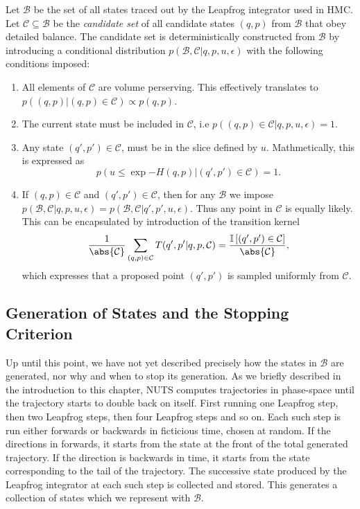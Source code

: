 Let $\mathcal{B}$ be the set of all states traced out by the Leapfrog integrator used in HMC. Let $\mathcal{C} \subseteq \mathcal{B}$ be 
the \textit{candidate set} of all candidate states $(q, p)$ from $\mathcal{B}$ that obey detailed balance. The candidate set is deterministically constructed from $\mathcal{B}$ by introducing a conditional distribution $p(\mathcal{B}, \mathcal{C}|q, p, u, \epsilon)$ with the following conditions imposed:
\begin{enumerate}
    \item All elements of $\mathcal{C}$ are volume perserving. This effectively translates to $p((q, p)|(q, p) \in \mathcal{C}) \propto p(q, p)$.
    \item The current state must be included in $\mathcal{C}$, i.e $p\left((q, p) \in \mathcal{C}|q, p, u, \epsilon\right) = 1$.
    \item Any state $(q', p') \in \mathcal{C}$, must be in the slice defined by $u$. 
    Mathmetically, this is expressed as $$p\left(u\leq \exp{-H(q, p)}\bigg|(q', p') \in \mathcal{C}\right) = 1.$$
    \item If $(q, p) \in \mathcal{C}$ and $(q', p') \in \mathcal{C}$, then for any $\mathcal{B}$ we impose 
    $p(\mathcal{B}, \mathcal{C}|q, p, u, \epsilon) = p(\mathcal{B}, \mathcal{C}|q', p', u, \epsilon)$.
    Thus any point in $\mathcal{C}$ is equally likely. This can be encapsulated by introduction of the transition kernel
    \begin{equation}
        \frac{1}{\abs{\mathcal{C}}}\sum_{(q, p) \in \mathcal{C}} T(q', p'|q,p,\mathcal{C}) = \frac{\mathbb{I}\left[(q',p') \in \mathcal{C}\right]}{\abs{\mathcal{C}}},
    \end{equation}
    which expresses that a proposed point $(q', p')$ is sampled uniformly from $\mathcal{C}$. 
\end{enumerate}


\subsection{Generation of States and the Stopping Criterion}
Up until this point, we have not yet described precisely how the states in $\mathcal{B}$ are generated,
nor why and when to stop its generation. As we briefly described in the introduction to this chapter, 
NUTS computes trajectories in phase-space until the trajectory starts to double back on itself. First running one Leapfrog step,
then two Leapfrog steps, then four Leapfrog steps and so on. Each such step is run either forwards or backwards in ficticious time, chosen at random.
If the directions in forwards, it starts from the state at the front of the total generated trajectory. If the direction is backwards in time, it starts from the state corresponding to the tail of the trajectory.
The successive state produced by the Leapfrog integrator at each such step is collected and stored. This generates a collection of states which we represent with $\mathcal{B}$. 

